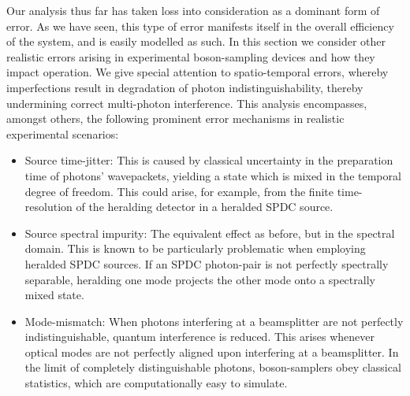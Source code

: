 \documentclass[aps,rmp,twocolumn,amsmath,amssymb,nofootinbib,superscriptaddress]{revtex4}
\begin{document}
Our analysis thus far has taken loss into consideration as a dominant form of error. As we have seen, this type of error manifests itself in the overall efficiency of the system, and is easily modelled as such. In this section we consider other realistic errors arising in experimental boson-sampling devices and how they impact operation. We give special attention to spatio-temporal errors, whereby imperfections result in degradation of photon indistinguishability, thereby undermining correct multi-photon interference. This analysis encompasses, amongst others, the following prominent error mechanisms in realistic experimental scenarios:
\begin{itemize}
\item Source time-jitter: This is caused by classical uncertainty in the preparation time of photons' wavepackets, yielding a state which is mixed in the temporal degree of freedom. This could arise, for example, from the finite time-resolution of the heralding detector in a heralded SPDC source. 
\item Source spectral impurity: The equivalent effect as before, but in the spectral domain. This is known to be particularly problematic when employing heralded SPDC sources. If an SPDC photon-pair is not perfectly spectrally separable, heralding one mode projects the other mode onto a spectrally mixed state.
\item Mode-mismatch: When photons interfering at a beamsplitter are not perfectly indistinguishable, quantum interference is reduced. This arises whenever optical modes are not perfectly aligned upon interfering at a beamsplitter. In the limit of completely distinguishable photons, boson-samplers obey classical statistics, which are computationally easy to simulate.
\end{itemize}
\end{document}

